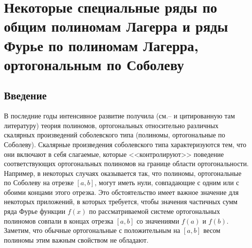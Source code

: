 \section{Некоторые специальные ряды по общим полиномам Лагерра и ряды Фурье по полиномам Лагерра, ортогональным по Соболеву }
\subsection{Введение}

В последние годы интенсивное развитие получила (см.\cite{sob-lag-sb-KwonLittl1}--\cite{sob-lag-sb-MarcelXu} и цитированную там литературу) теория полиномов, ортогональных относительно различных скалярных произведений соболевского типа (полиномы, ортогональные по Соболеву). Скалярные произведения соболевского типа характеризуются тем, что они включают в себя слагаемые, которые <<контролируют>> поведение соответствующих ортогональных полиномов на границе области ортогональности. Например, в некоторых случаях оказывается так, что полиномы, ортогональные по Соболеву на отрезке $[a,b]$, могут иметь нули, совпадающие с одним или с обоими концами этого отрезка. Это обстоятельство имеет важное значение для некоторых приложений, в которых требуется, чтобы значения  частичных сумм ряда Фурье функции $f(x)$ по рассматриваемой системе ортогональных полиномов совпали в концах отрезка $[a,b]$ со значениями $f(a)$ и $f(b)$. Заметим, что обычные ортогональные с положительным на  $[a,b]$ весом полиномы этим важным свойством не обладают.


